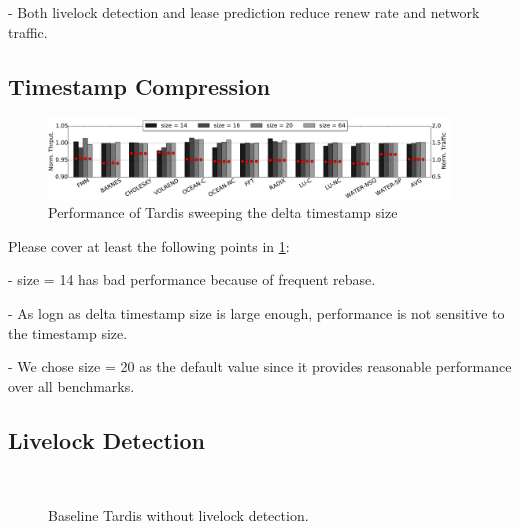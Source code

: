 \documentclass[12pt]{article}
\begin{document}
- Both livelock detection and lease prediction reduce renew rate and 
  network traffic.

\subsection{Timestamp Compression}

\begin{figure}
	\centering
	\includegraphics[width=0.95\textwidth]{figs/tssize.pdf}
	\caption{ Performance of Tardis sweeping the delta timestamp size}
	\label{fig:tssize}
\end{figure}

Please cover at least the following points in \cref{fig:tssize}:

- size = 14 has bad performance because of frequent rebase.

- As logn as delta timestamp size is large enough, performance is not 
  sensitive to the timestamp size.

- We chose size = 20 as the default value since it provides reasonable 
  performance over all benchmarks.

\subsection{Livelock Detection}

\begin{figure}
	\centering
	\\
	\caption{ Baseline Tardis without livelock detection. }
	\label{fig:self-nolive}
\end{figure}
\end{document}

